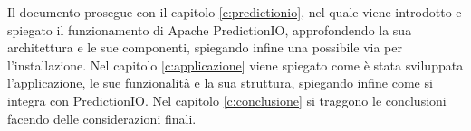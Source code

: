 Il documento prosegue con il capitolo \ref{c:predictionio}, nel quale viene introdotto e spiegato il funzionamento di Apache PredictionIO, approfondendo la sua architettura e le sue componenti, spiegando infine una possibile via per l'installazione. Nel capitolo \ref{c:applicazione} viene spiegato come è stata sviluppata l'applicazione, le sue funzionalità e la sua struttura, spiegando infine come si integra con PredictionIO. Nel capitolo \ref{c:conclusione} si traggono le conclusioni facendo delle considerazioni finali.
